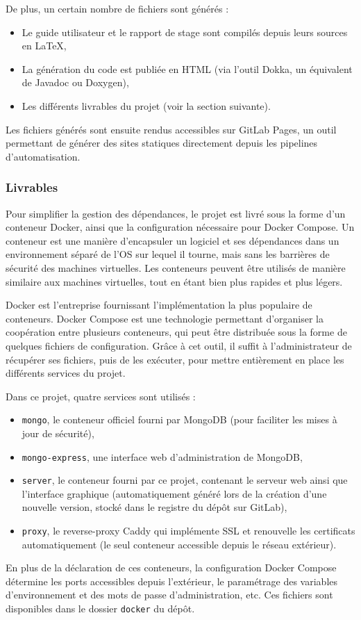 \documentclass[11pt,french]{memoir}
\begin{document}
	De plus, un certain nombre de fichiers sont générés :
	\begin{itemize}
		\item Le guide utilisateur et le rapport de stage sont compilés depuis leurs sources en \LaTeX,
		\item La génération du code est publiée en HTML (via l'outil Dokka, un équivalent de Javadoc ou Doxygen),
		\item Les différents livrables du projet (voir la section suivante).
	\end{itemize}
	Les fichiers générés sont ensuite rendus accessibles sur GitLab Pages, un outil permettant de générer des sites statiques directement depuis les pipelines d'automatisation.

	\subsubsection{Livrables}

	Pour simplifier la gestion des dépendances, le projet est livré sous la forme d'un conteneur Docker, ainsi que la configuration nécessaire pour Docker Compose.
	Un conteneur est une manière d'encapsuler un logiciel et ses dépendances dans un environnement séparé de l'OS sur lequel il tourne, mais sans les barrières de sécurité des machines virtuelles.
	Les conteneurs peuvent être utilisés de manière similaire aux machines virtuelles, tout en étant bien plus rapides et plus légers.

	Docker est l'entreprise fournissant l'implémentation la plus populaire de conteneurs.
	Docker Compose est une technologie permettant d'organiser la coopération entre plusieurs conteneurs, qui peut être distribuée sous la forme de quelques fichiers de configuration.
	Grâce à cet outil, il suffit à l'administrateur de récupérer ses fichiers, puis de les exécuter, pour mettre entièrement en place les différents services du projet.

	Dans ce projet, quatre services sont utilisés :
	\begin{itemize}
		\item \lstinline{mongo}, le conteneur officiel fourni par MongoDB (pour faciliter les mises à jour de sécurité),
		\item \lstinline{mongo-express}, une interface web d'administration de MongoDB,
		\item \lstinline{server}, le conteneur fourni par ce projet, contenant le serveur web ainsi que l'interface graphique (automatiquement généré lors de la création d'une nouvelle version, stocké dans le registre du dépôt sur GitLab),
		\item \lstinline{proxy}, le reverse-proxy Caddy qui implémente SSL et renouvelle les certificats automatiquement (le seul conteneur accessible depuis le réseau extérieur).
	\end{itemize}
	En plus de la déclaration de ces conteneurs, la configuration Docker Compose détermine les ports accessibles depuis l'extérieur, le paramétrage des variables d'environnement et des mots de passe d'administration, etc.
	Ces fichiers sont disponibles dans le dossier \lstinline{docker} du dépôt.
\end{document}
